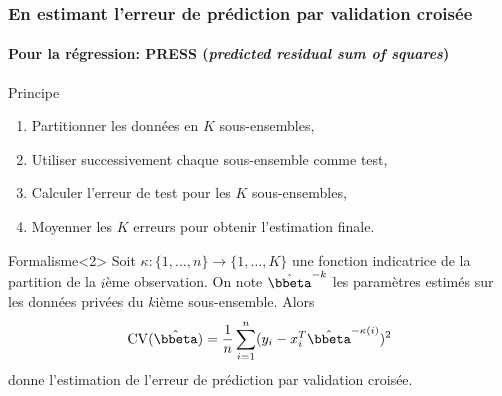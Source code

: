 \documentclass{beamer}\usepackage[]{graphicx}\usepackage[]{color}
\begin{document}
\begin{frame}
 \frametitle{En estimant l'erreur de prédiction par validation croisée}
 \framesubtitle{Pour la régression: PRESS (\textit{predicted residual sum of squares})}

 \begin{block}{Principe}
   \vspace{-.25cm}
   \begin{enumerate}
   \item Partitionner les données en $K$ sous-ensembles,
   \item Utiliser successivement chaque sous-ensemble comme test,
   \item Calculer l'erreur de test pour les $K$ sous-ensembles,
   \item Moyenner les $K$ erreurs pour obtenir l'estimation finale.
   \end{enumerate}
 \end{block}

 \vspace{-.25cm}

 \begin{block}{Formalisme}<2>
   Soit  $\kappa  :   \{1,\dots,n\}  \rightarrow  \{1,\dots,K\}$  une
   fonction indicatrice de la partition de la $i$ème observation.  On
   note  $\hat{\bbeta}^{-k}$ les  paramètres estimés  sur les  données
   privées du $k$ième sous-ensemble. Alors
  \begin{equation*}
    \mathrm{CV}(\hat{\bbeta})     =    \frac{1}{n}\sum_{i=1}^n
    (y_i - x_i^T \hat{\bbeta}^{-\kappa(i)} )^2
  \end{equation*}
  donne  l'estimation  de  l'erreur   de  prédiction  par  validation
  croisée.
 \end{block}

\end{frame}
\end{document}
